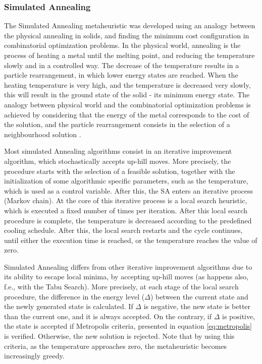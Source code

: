 \subsubsection{Simulated Annealing}
\label{sec:sa_lr}

The Simulated Annealing metaheuristic was developed using an analogy between the physical annealing in solids, and finding the minimum cost configuration in combinatorial optimization problems. In the physical world, annealing is the process of heating a metal until the melting point,  and reducing the temperature slowly and in a controlled way. The decrease of the temperature results in a particle rearrangement, in which lower energy states are reached. When the heating temperature is very high, and the temperature is decreased very slowly, this will result in the ground state of the solid - its minimum energy state. The analogy between physical world and the combinatorial optimization problems is achieved by considering that the energy of the metal corresponds to the cost of the solution, and the particle rearrangement consists in the selection of a neighbourhood solution \cite{simulated_annealing_1}.

Most simulated Annealing algorithms consist in an iterative improvement algorithm, which stochastically accepts up-hill moves. More precisely, the procedure starts with the selection of a feasible solution, together with the initialization of some algorithmic specific parameters, such as the temperature, which is used as a control variable. After this, the SA enters an iterative process (Markov chain). At the core of this iterative process is a local search heuristic, which is executed a fixed number of times per iteration. After this local search procedure is complete, the temperature is decreased according to the predefined cooling schedule. After this, the local search restarts and the cycle continues, until either the execution time is reached, or the temperature reaches the value of zero.

Simulated Annealing differs from other iterative improvement algorithms due to its ability to escape local minima, by accepting up-hill moves (as happens also, f.e., with the Tabu Search). More precisely, at each stage of the local search procedure, the difference in the energy level ($\Delta$) between the current state and the newly generated state is calculated. If $\Delta$ is negative, the new state is better than the current one, and it is always accepted. On the contrary, if $\Delta$ is positive, the state is accepted if Metropolis criteria, presented in equation \ref{eq:metropolis} is verified. Otherwise, the new solution is rejected. Note that by using this criteria, as the temperature approaches zero, the metaheuristic becomes increasingly greedy.

